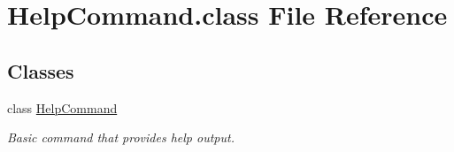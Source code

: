 \hypertarget{HelpCommand_8class}{\section{Help\-Command.\-class File Reference}
\label{HelpCommand_8class}
}
\subsection*{Classes}
\begin{DoxyCompactItemize}
\item 
class \hyperlink{classHelpCommand}{Help\-Command}
\begin{DoxyCompactList}\small\item\em Basic command that provides help output. \end{DoxyCompactList}\end{DoxyCompactItemize}
